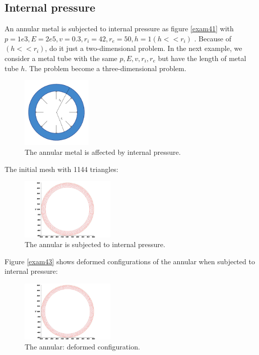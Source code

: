 \documentclass[notitlepage,a4paper,fleqn,9pt]{icmfarticle}
\begin{document}
\begin{multicols}{2}
\subsection{Internal pressure}
An annular metal is subjected to internal pressure as figure \eqref{exam41} with $p=1e3,E=2e5, v=0.3, r_i=42, r_e=50, h=1 (h<<r_i)$ \cite{TIT-07}. Because of $(h<<r_i)$, do it just a two-dimensional problem. In the next example, we consider a metal tube with the same $p, E, v, r_i, r_e$ but have the length of metal tube $h$. The problem become a three-dimensional problem.
\begin{figure}[H]
  \begin{center}
    \includegraphics[width=0.3\textwidth]{4-4.pdf}
  \end{center}
  \caption{The annular metal is affected by internal pressure.}
  \label{exam41}
\end{figure}
The initial mesh with 1144 triangles:
\begin{figure}[H]
  \begin{center}
    \includegraphics[width=0.4\textwidth]{4-4-1.pdf}
  \end{center}
  \caption{The annular is subjected to internal pressure.}
  \label{exam42}
\end{figure}
Figure \eqref{exam43} shows deformed configurations of the annular when subjected to internal pressure:
\begin{figure}[H]
  \begin{center}
    \includegraphics[width=0.4\textwidth]{4-4-2.pdf}
  \end{center}
  \caption{The annular: deformed configuration.}
  \label{exam43}
\end{figure}


\end{multicols}
\end{document}
